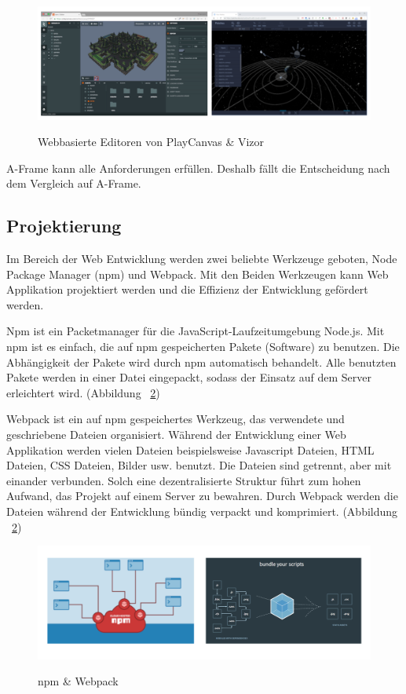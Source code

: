\begin{figure}[ht]
\centering
\caption[Webbasierte Engine]{Webbasierte Editoren von PlayCanvas \& Vizor}
\includegraphics[width=\textwidth]{images/playCanvasVizor.png}
\label{fig:Webbasierte Engine}
\end{figure}

 A-Frame kann alle Anforderungen erfüllen. Deshalb fällt die Entscheidung nach dem Vergleich auf A-Frame.
 
 \subsection{Projektierung}
 Im Bereich der Web Entwicklung werden zwei beliebte Werkzeuge geboten, Node Package Manager (npm) und Webpack. Mit den Beiden Werkzeugen kann Web Applikation projektiert werden und die Effizienz der Entwicklung gefördert werden.
 
 Npm ist ein Packetmanager für die JavaScript-Laufzeitumgebung Node.js. Mit npm ist es einfach, die auf npm gespeicherten Pakete (Software) zu benutzen. Die Abhängigkeit der Pakete wird durch npm automatisch behandelt. Alle benutzten Pakete werden in einer Datei eingepackt, sodass der Einsatz auf dem Server erleichtert wird. (Abbildung ~\ref{fig:npmWebpack})
 
 Webpack ist ein auf npm gespeichertes Werkzeug, das verwendete und geschriebene Dateien organisiert. Während der Entwicklung einer Web Applikation werden vielen Dateien beispielsweise Javascript Dateien, HTML Dateien, CSS Dateien, Bilder usw. benutzt. Die Dateien sind getrennt, aber mit einander verbunden. Solch eine dezentralisierte Struktur führt zum hohen Aufwand, das Projekt auf einem Server zu bewahren. Durch Webpack werden die Dateien während der Entwicklung bündig verpackt und komprimiert. (Abbildung ~\ref{fig:npmWebpack})
 
\begin{figure}[ht]
\centering
\caption[Projektierungswerkzeuge]{npm \& Webpack}
\includegraphics[width=\textwidth]{images/npmWebpack.png}
\label{fig:npmWebpack}
\end{figure}
 
